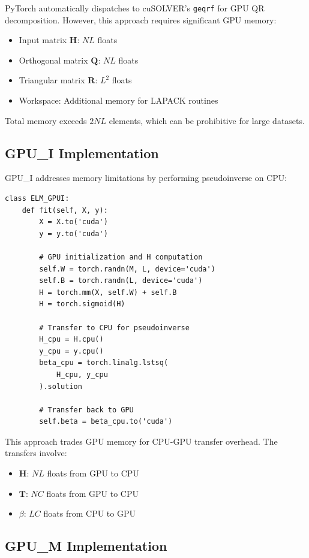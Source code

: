 \documentclass[conference]{IEEEtran}
\begin{document}
PyTorch automatically dispatches to cuSOLVER's \texttt{geqrf} for GPU QR decomposition. However, this approach requires significant GPU memory:

\begin{itemize}
\item Input matrix $\mathbf{H}$: $NL$ floats
\item Orthogonal matrix $\mathbf{Q}$: $NL$ floats
\item Triangular matrix $\mathbf{R}$: $L^2$ floats
\item Workspace: Additional memory for LAPACK routines
\end{itemize}

Total memory exceeds $2NL$ elements, which can be prohibitive for large datasets.

\subsection{GPU\_I Implementation}

GPU\_I addresses memory limitations by performing pseudoinverse on CPU:

{\small\begin{verbatim}
class ELM_GPUI:
    def fit(self, X, y):
        X = X.to('cuda')
        y = y.to('cuda')
        
        # GPU initialization and H computation
        self.W = torch.randn(M, L, device='cuda')
        self.B = torch.randn(L, device='cuda')
        H = torch.mm(X, self.W) + self.B
        H = torch.sigmoid(H)
        
        # Transfer to CPU for pseudoinverse
        H_cpu = H.cpu()
        y_cpu = y.cpu()
        beta_cpu = torch.linalg.lstsq(
            H_cpu, y_cpu
        ).solution
        
        # Transfer back to GPU
        self.beta = beta_cpu.to('cuda')
\end{verbatim}}

This approach trades GPU memory for CPU-GPU transfer overhead. The transfers involve:
\begin{itemize}
\item $\mathbf{H}$: $NL$ floats from GPU to CPU
\item $\mathbf{T}$: $NC$ floats from GPU to CPU
\item $\beta$: $LC$ floats from CPU to GPU
\end{itemize}

\subsection{GPU\_M Implementation}
\end{document}
